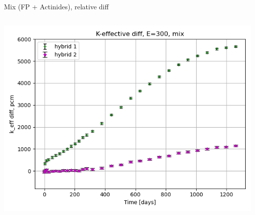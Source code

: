 \documentclass[
	11pt, %
	aspectratio=169, %
]{beamer}
\begin{document}
\begin{frame}{Mix (FP + Actinides), relative diff}
	\begin{columns}[c] %
		\begin{column}{0.39\textwidth}
			\includegraphics[width=\textwidth]{../figures/keff/keff_mix_300_diff.png}


\end{column}
\end{columns}
\end{frame}
\end{document}

